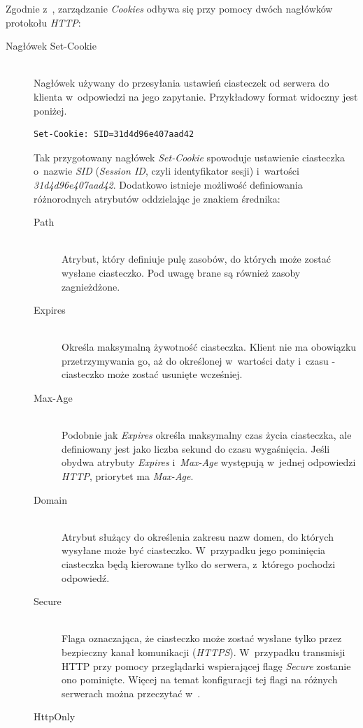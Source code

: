 \documentclass[11pt]{aghdpl}
\begin{document}
Zgodnie z~\cite{RfcC11}, zarządzanie \emph{Cookies} odbywa się przy pomocy dwóch nagłówków protokołu \emph{HTTP}:
\begin{description}
\item[Nagłówek Set-Cookie] \hfill \\
Nagłówek używany do przesyłania ustawień ciasteczek od serwera do klienta w~odpowiedzi na jego zapytanie. Przykładowy format widoczny jest poniżej.
\begin{lstlisting}
Set-Cookie: SID=31d4d96e407aad42
\end{lstlisting}
Tak przygotowany nagłówek \emph{Set-Cookie} spowoduje ustawienie ciasteczka o~nazwie \emph{SID} (\emph{Session ID}, czyli identyfikator sesji) i~wartości \emph{31d4d96e407aad42}. Dodatkowo istnieje możliwość definiowania różnorodnych atrybutów oddzielając je znakiem średnika:
\begin{description}
\item[Path] \hfill \\
Atrybut, który definiuje pulę zasobów, do których może zostać wysłane ciasteczko. Pod uwagę brane są również zasoby zagnieżdżone.
\item[Expires] \hfill \\
Określa maksymalną żywotność ciasteczka. Klient nie ma obowiązku przetrzymywania go, aż do określonej w~wartości daty i~czasu - ciasteczko może zostać usunięte wcześniej.
\item[Max-Age] \hfill \\
Podobnie jak \emph{Expires} określa maksymalny czas życia ciasteczka, ale definiowany jest jako liczba sekund do czasu wygaśnięcia. Jeśli obydwa atrybuty \emph{Expires} i~\emph{Max-Age} występują w~jednej odpowiedzi \emph{HTTP}, priorytet ma \emph{Max-Age}.
\item[Domain] \hfill \\
Atrybut służący do określenia zakresu nazw domen, do których wysyłane może być ciasteczko. W~przypadku jego pominięcia ciasteczka będą kierowane tylko do serwera, z~którego pochodzi odpowiedź.
\item[Secure] \hfill \\
Flaga oznaczająca, że ciasteczko może zostać wysłane tylko przez bezpieczny kanał komunikacji (\emph{HTTPS}). W~przypadku transmisji HTTP przy pomocy przeglądarki wspierającej flagę \emph{Secure} zostanie ono pominięte. Więcej na temat konfiguracji tej flagi na różnych serwerach można przeczytać w~\cite{SecF}.
\item[HttpOnly] \hfill \\

\end{description}
\end{description}
\end{document}
